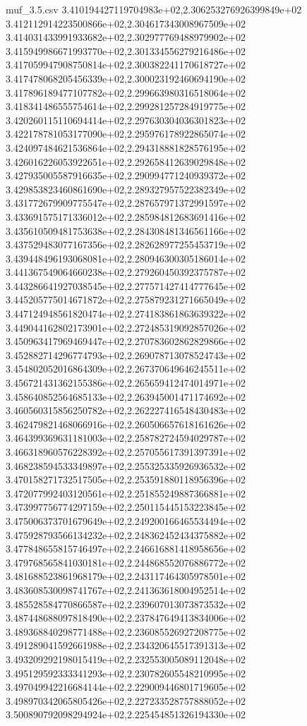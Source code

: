 \begin{filecontents*}{muf_3.5.csv}
3.410194427119704983e+02,2.306253276926399849e+02
3.412112914223500866e+02,2.304617343008967509e+02
3.414031433991933682e+02,2.302977769488979902e+02
3.415949986671993770e+02,2.301334556279216486e+02
3.417059947908750814e+02,2.300382241170618727e+02
3.417478068205456339e+02,2.300023192460694190e+02
3.417896189477107782e+02,2.299663980316518064e+02
3.418341486555754614e+02,2.299281257284919775e+02
3.420260115110694414e+02,2.297630304036301823e+02
3.422178781053177090e+02,2.295976178922865074e+02
3.424097484621536864e+02,2.294318881828576195e+02
3.426016226053922651e+02,2.292658412639029848e+02
3.427935005587916635e+02,2.290994771240939372e+02
3.429853823460861690e+02,2.289327957522382349e+02
3.431772679909775547e+02,2.287657971372991597e+02
3.433691575171336012e+02,2.285984812683691416e+02
3.435610509481753638e+02,2.284308481346561166e+02
3.437529483077167356e+02,2.282628977255453719e+02
3.439448496193068081e+02,2.280946300305186014e+02
3.441367549064660238e+02,2.279260450392375787e+02
3.443286641927038545e+02,2.277571427414777645e+02
3.445205775014671872e+02,2.275879231271665049e+02
3.447124948561820474e+02,2.274183861863639322e+02
3.449044162802173901e+02,2.272485319092857026e+02
3.450963417969469447e+02,2.270783602862829866e+02
3.452882714296774793e+02,2.269078713078524743e+02
3.454802052016864309e+02,2.267370649646245511e+02
3.456721431362155386e+02,2.265659412474014971e+02
3.458640852564685133e+02,2.263945001471174692e+02
3.460560315856250782e+02,2.262227416548430483e+02
3.462479821468066916e+02,2.260506657618161626e+02
3.464399369631181003e+02,2.258782724594029787e+02
3.466318960576228392e+02,2.257055617391397391e+02
3.468238594533349897e+02,2.255325335926936532e+02
3.470158271732517505e+02,2.253591880118956396e+02
3.472077992403120561e+02,2.251855249887366881e+02
3.473997756774297159e+02,2.250115445153223845e+02
3.475006373701679649e+02,2.249200166465534494e+02
3.475928793566134232e+02,2.248362452434375882e+02
3.477848655815746497e+02,2.246616881418958656e+02
3.479768565841030181e+02,2.244868552076886772e+02
3.481688523861968179e+02,2.243117464305978501e+02
3.483608530098741767e+02,2.241363618004952514e+02
3.485528584770866587e+02,2.239607013073873532e+02
3.487448688097818490e+02,2.237847649413834006e+02
3.489368840298771488e+02,2.236085526927208775e+02
3.491289041592661988e+02,2.234320645517391313e+02
3.493209292198015419e+02,2.232553005089112048e+02
3.495129592333341293e+02,2.230782605548210995e+02
3.497049942216684144e+02,2.229009446801719605e+02
3.498970342065805426e+02,2.227233528757888052e+02
3.500890792098294924e+02,2.225454851326194330e+02

\end{filecontents*}
